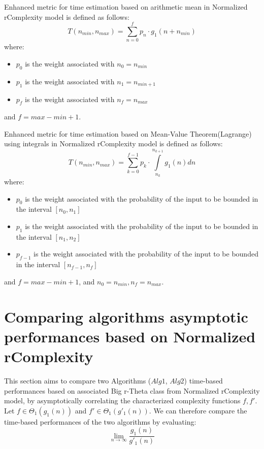 \begin{definition} Enhanced metric for time estimation based on arithmetic mean in Normalized rComplexity model is defined as follows:
\[  T(n_{min}, n_{max}) = \sum\limits_{n=0}^{f} p_{n} \cdot g_{1}(n + n_{min})  \]
where:
\begin{itemize}
	\item $p_{0}$ is the weight associated with $n_{0} = n_{min}$
	\item $p_{1}$ is the weight associated with $n_{1} = n_{min + 1}$
	\item $p_{f}$ is the weight associated with $n_{f} = n_{max}$
\end{itemize}
and $f = max - min + 1$.
\end{definition}

\begin{definition} Enhanced metric for time estimation based on Mean-Value Theorem(Lagrange) using integrals in Normalized rComplexity model is defined as follows:
\[  T(n_{min}, n_{max}) =\sum\limits_{k=0}^{f-1} p_{k} \cdot \int\limits_{n_{k}}^{n_{k+1}} g_{1}(n) dn  \]
where:
\begin{itemize}
	\item $p_{0}$ is the weight associated with the probability of the input to be bounded in the interval $[n_{0}, n_{1}]$
	\item $p_{1}$ is the weight associated with the probability of the input to be bounded in the interval $[n_{1}, n_{2}]$
	\item $p_{f-1}$ is the weight associated with the probability of the input to be bounded in the interval $[n_{f-1}, n_{f}]$
\end{itemize}
and $f = max - min + 1$, and $n_{0} = n_{min}, n_{f} = n_{max}$.
\end{definition}

\section{Comparing algorithms asymptotic performances based on Normalized rComplexity}


This section aims to compare two Algorithms ($Alg1$, $Alg2$) time-based performances based on associated Big r-Theta class from Normalized rComplexity model, by asymptotically correlating the characterized complexity functions $f, f'$. \\
Let $f \in \Theta_{1}(g_{1}(n))$ and $f' \in \Theta_{1}(g'_{1}(n))$.
We can therefore compare the time-based performances of the two algorithms by evaluating:  \[\lim_{n\to\infty} \dfrac{g_{1}(n)}{g'_{1}(n)}\]

